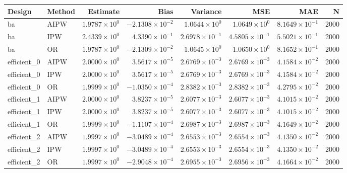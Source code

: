 \begin{table}[ht]
\centering
\begin{tabular}{llrrrrrr}
  \toprule
Design & Method & Estimate & Bias & Variance & MSE & MAE & N \\ 
  \midrule
ba & AIPW & $1.9787 \times 10^{0}$ & $-2.1308 \times 10^{-2}$ & $1.0644 \times 10^{0}$ & $1.0649 \times 10^{0}$ & $8.1649 \times 10^{-1}$ & 2000 \\ 
  ba & IPW & $2.4339 \times 10^{0}$ & $4.3390 \times 10^{-1}$ & $2.6978 \times 10^{-1}$ & $4.5805 \times 10^{-1}$ & $5.5021 \times 10^{-1}$ & 2000 \\ 
  ba & OR & $1.9787 \times 10^{0}$ & $-2.1309 \times 10^{-2}$ & $1.0645 \times 10^{0}$ & $1.0650 \times 10^{0}$ & $8.1652 \times 10^{-1}$ & 2000 \\ 
   \midrule
efficient\_0 & AIPW & $2.0000 \times 10^{0}$ & $3.5617 \times 10^{-5}$ & $2.6769 \times 10^{-3}$ & $2.6769 \times 10^{-3}$ & $4.1584 \times 10^{-2}$ & 2000 \\ 
  efficient\_0 & IPW & $2.0000 \times 10^{0}$ & $3.5617 \times 10^{-5}$ & $2.6769 \times 10^{-3}$ & $2.6769 \times 10^{-3}$ & $4.1584 \times 10^{-2}$ & 2000 \\ 
  efficient\_0 & OR & $1.9999 \times 10^{0}$ & $-1.0350 \times 10^{-4}$ & $2.8382 \times 10^{-3}$ & $2.8382 \times 10^{-3}$ & $4.2795 \times 10^{-2}$ & 2000 \\ 
   \midrule
efficient\_1 & AIPW & $2.0000 \times 10^{0}$ & $3.8237 \times 10^{-5}$ & $2.6077 \times 10^{-3}$ & $2.6077 \times 10^{-3}$ & $4.1015 \times 10^{-2}$ & 2000 \\ 
  efficient\_1 & IPW & $2.0000 \times 10^{0}$ & $3.8237 \times 10^{-5}$ & $2.6077 \times 10^{-3}$ & $2.6077 \times 10^{-3}$ & $4.1015 \times 10^{-2}$ & 2000 \\ 
  efficient\_1 & OR & $1.9999 \times 10^{0}$ & $-1.1107 \times 10^{-4}$ & $2.6987 \times 10^{-3}$ & $2.6987 \times 10^{-3}$ & $4.1649 \times 10^{-2}$ & 2000 \\ 
   \midrule
efficient\_2 & AIPW & $1.9997 \times 10^{0}$ & $-3.0489 \times 10^{-4}$ & $2.6553 \times 10^{-3}$ & $2.6554 \times 10^{-3}$ & $4.1350 \times 10^{-2}$ & 2000 \\ 
  efficient\_2 & IPW & $1.9997 \times 10^{0}$ & $-3.0489 \times 10^{-4}$ & $2.6553 \times 10^{-3}$ & $2.6554 \times 10^{-3}$ & $4.1350 \times 10^{-2}$ & 2000 \\ 
  efficient\_2 & OR & $1.9997 \times 10^{0}$ & $-2.9048 \times 10^{-4}$ & $2.6955 \times 10^{-3}$ & $2.6956 \times 10^{-3}$ & $4.1664 \times 10^{-2}$ & 2000 \\ 

\end{tabular}
\end{table}
